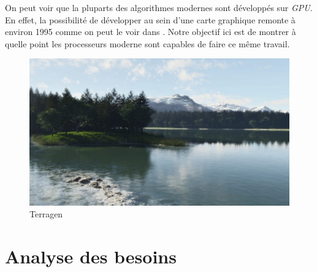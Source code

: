 \documentclass[12pt]{report}
\begin{document}
On peut voir que la pluparts des algorithmes modernes sont développés sur \emph{GPU}.
En effet, la possibilité de développer au sein d'une carte graphique remonte à environ
1995 comme on peut le voir dans \cite{EvoGPU}. Notre objectif ici est de montrer 
à quelle point les processeurs moderne sont capables de faire ce même travail.

\begin{center}
\begin{figure}[!h]
  \includegraphics[scale=0.2]{img/Lake.jpg}
  \caption{Terragen \cite{Terragen}}
  \label{fig:Terragen}
\end{figure}
\end{center}


\newpage

\chapter*{Analyse des besoins}
\setcounter{chapter}{3}


\end{document}
